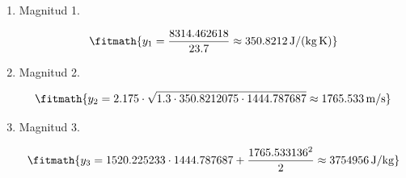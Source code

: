 \begin{enumerate}

\item Magnitud 1.

\[\fitmath{y_{1}=\frac{8314.462618}{23.7}\approx 350.8212\,\mathrm{J/(kg\,K)}}\]

\item Magnitud 2.

\[\fitmath{y_{2}=2.175\cdot \sqrt{1.3\cdot 350.8212075\cdot 1444.787687}\approx 1765.533\,\mathrm{m/s}}\]

\item Magnitud 3.

\[\fitmath{y_{3}=1520.225233\cdot 1444.787687+\frac{{1765.533136}^{2}}{2}\approx 3754956\,\mathrm{J/kg}}\]

\end{enumerate}
